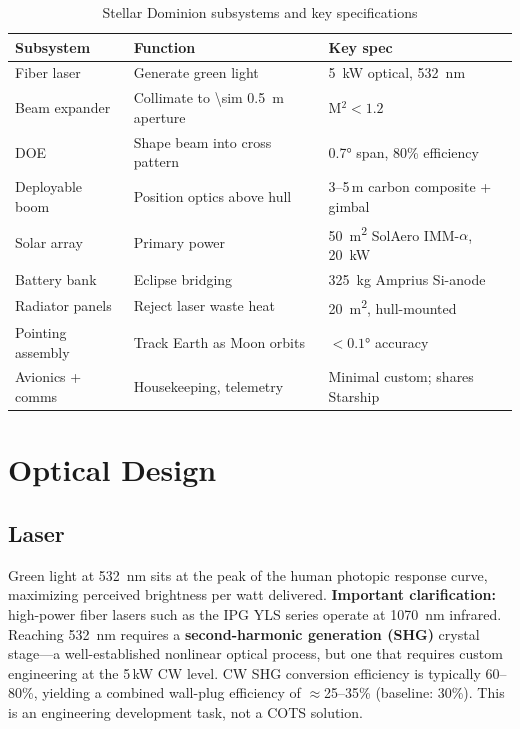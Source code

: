 \documentclass[10pt,letterpaper]{article}
\begin{document}
\begin{table}[!ht]
\centering\small
\caption{Stellar Dominion subsystems and key specifications}
\label{tab:subsystems}
\setlength{\tabcolsep}{4pt}
\begin{tabularx}{\linewidth}{lXX}
\toprule
\textbf{Subsystem} & \textbf{Function} & \textbf{Key spec} \\
\midrule
Fiber laser & Generate green light & \SI{5}{\kilo\watt} optical, \SI{532}{\nano\meter} \\
Beam expander & Collimate to \SI{\sim 0.5}{\meter} aperture & M$^2 < 1.2$ \\
DOE & Shape beam into cross pattern & \ang{0.7} span, 80\% efficiency \\
Deployable boom & Position optics above hull & 3--5\,m carbon composite + gimbal \\
Solar array & Primary power & \SI{50}{\meter\squared} SolAero IMM-$\alpha$, \SI{20}{\kilo\watt} \\
Battery bank & Eclipse bridging & \SI{325}{\kilo\gram} Amprius Si-anode \\
Radiator panels & Reject laser waste heat & \SI{20}{\meter\squared}, hull-mounted \\
Pointing assembly & Track Earth as Moon orbits & $< \ang{0.1}$ accuracy \\
Avionics + comms & Housekeeping, telemetry & Minimal custom; shares Starship \\
\bottomrule
\end{tabularx}
\end{table}

\section{Optical Design}

\subsection{Laser}

Green light at \SI{532}{\nano\meter} sits at the peak of the human photopic
response curve, maximizing perceived brightness per watt delivered.
\textbf{Important clarification:} high-power fiber lasers such as the IPG YLS
series operate at \SI{1070}{\nano\meter} infrared. Reaching \SI{532}{\nano\meter}
requires a \textbf{second-harmonic generation (SHG)} crystal stage---a well-established
nonlinear optical process, but one that requires custom engineering at the 5\,kW CW level.
CW SHG conversion efficiency is typically 60--80\%, yielding a combined wall-plug efficiency
of $\approx$25--35\% (baseline: 30\%). This is an engineering development task, not a COTS
solution.
\end{document}

